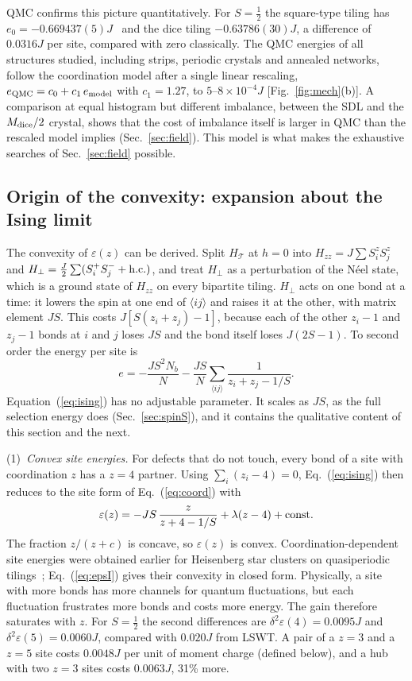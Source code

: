 \documentclass[prb,twocolumn,amsmath,amssymb,floatfix]{revtex4-2}
\newcommand{\Md}{M_{\rm dice}}
\newcommand{\eps}{\varepsilon}
\begin{document}
QMC confirms this picture quantitatively. For $S=\frac12$ the square-type tiling has $e_0=-0.669437(5)J$~\cite{Sandvik1997} and the dice tiling $-0.63786(30)J$, a difference of $0.0316J$ per site, compared with zero classically. The QMC energies of all structures studied, including strips, periodic crystals and annealed networks, follow the coordination model after a single linear rescaling, $e_{\rm QMC}=c_0+c_1\,e_{\rm model}$ with $c_1=1.27$, to $5$--$8\times10^{-4}J$ [Fig.~\ref{fig:mech}(b)]. A comparison at equal histogram but different imbalance, between the SDL and the $\Md/2$ crystal, shows that the cost of imbalance itself is larger in QMC than the rescaled model implies (Sec.~\ref{sec:field}). This model is what makes the exhaustive searches of Sec.~\ref{sec:field} possible.

\subsection{Origin of the convexity: expansion about the Ising limit}\label{sec:ising}

The convexity of $\eps(z)$ can be derived. Split $H_{\mathcal T}$ at $h=0$ into $H_{zz}=J\sum S^z_iS^z_j$ and $H_\perp=\frac J2\sum(S^+_iS^-_j+{\rm h.c.})$, and treat $H_\perp$ as a perturbation of the N\'eel state, which is a ground state of $H_{zz}$ on every bipartite tiling. $H_\perp$ acts on one bond at a time: it lowers the spin at one end of $\langle ij\rangle$ and raises it at the other, with matrix element $JS$. This costs $J[S(z_i+z_j)-1]$, because each of the other $z_i-1$ and $z_j-1$ bonds at $i$ and $j$ loses $JS$ and the bond itself loses $J(2S-1)$. To second order the energy per site is
\begin{equation}
e=-\frac{JS^2N_b}{N}-\frac{JS}{N}\sum_{\langle ij\rangle}\frac1{z_i+z_j-1/S}.
\label{eq:ising}
\end{equation}
Equation~(\ref{eq:ising}) has no adjustable parameter. It scales as $JS$, as the full selection energy does (Sec.~\ref{sec:spinS}), and it contains the qualitative content of this section and the next.

(1)~\emph{Convex site energies.} For defects that do not touch, every bond of a site with coordination $z$ has a $z=4$ partner. Using $\sum_i(z_i-4)=0$, Eq.~(\ref{eq:ising}) then reduces to the site form of Eq.~(\ref{eq:coord}) with
\begin{equation}
\eps(z)=-JS\,\frac{z}{z+4-1/S}+\lambda(z-4)+{\rm const}.
\label{eq:epsI}
\end{equation}
The fraction $z/(z+c)$ is concave, so $\eps(z)$ is convex. Coordination-dependent site energies were obtained earlier for Heisenberg star clusters on quasiperiodic tilings~\cite{Jagannathan2004star}; Eq.~(\ref{eq:epsI}) gives their convexity in closed form. Physically, a site with more bonds has more channels for quantum fluctuations, but each fluctuation frustrates more bonds and costs more energy. The gain therefore saturates with $z$. For $S=\frac12$ the second differences are $\delta^2\eps(4)=0.0095J$ and $\delta^2\eps(5)=0.0060J$, compared with $0.020J$ from LSWT. A pair of a $z=3$ and a $z=5$ site costs $0.0048J$ per unit of moment charge (defined below), and a hub with two $z=3$ sites costs $0.0063J$, 31\% more.
\end{document}
